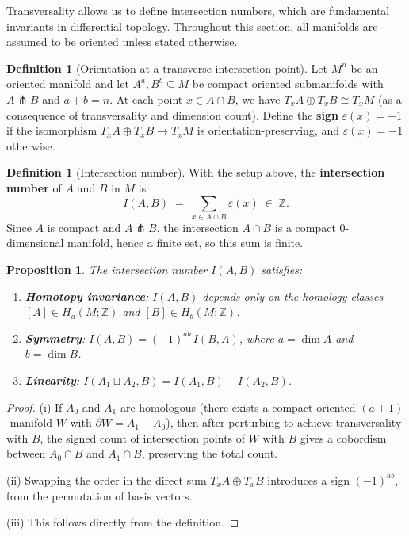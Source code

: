 \documentclass[12pt,a4paper,openany]{book}
\newtheorem{proposition}[theorem]{Proposition}
\theoremstyle{definition}
\newtheorem{definition}[theorem]{Definition}
\theoremstyle{remark}
\newcommand{\Z}{\mathbb{Z}}
\begin{document}
Transversality allows us to define intersection numbers, which are
fundamental invariants in differential topology. Throughout this section,
all manifolds are assumed to be oriented unless stated otherwise.

\begin{definition}[Orientation at a transverse intersection point]
\label{def:intersection-orientation}
Let $M^n$ be an oriented manifold and let $A^a, B^b \subseteq M$ be
compact oriented submanifolds with $A \pitchfork B$ and $a + b = n$.
At each point $x \in A \cap B$, we have
$T_x A \oplus T_x B \cong T_x M$ (as a consequence of transversality and
dimension count). Define the \textbf{sign} $\varepsilon(x) = +1$ if the
isomorphism $T_x A \oplus T_x B \to T_x M$ is orientation-preserving, and
$\varepsilon(x) = -1$ otherwise.
\end{definition}

\begin{definition}[Intersection number]\label{def:intersection-number}
With the setup above, the \textbf{intersection number} of $A$ and $B$
in $M$ is
\[
  I(A, B) \;=\; \sum_{x \in A \cap B} \varepsilon(x) \;\in\; \Z.
\]
Since $A$ is compact and $A \pitchfork B$, the intersection $A \cap B$ is a
compact $0$-dimensional manifold, hence a finite set, so this sum is finite.
\end{definition}

\begin{proposition}\label{prop:intersection-number-properties}
The intersection number $I(A, B)$ satisfies:
\begin{enumerate}[label=(\roman*)]
  \item \textbf{Homotopy invariance}: $I(A, B)$ depends only on the
    homology classes $[A] \in H_a(M; \Z)$ and $[B] \in H_b(M; \Z)$.
  \item \textbf{Symmetry}: $I(A, B) = (-1)^{ab}\, I(B, A)$, where
    $a = \dim A$ and $b = \dim B$.
  \item \textbf{Linearity}: $I(A_1 \sqcup A_2, B) = I(A_1, B) + I(A_2, B)$.
\end{enumerate}
\end{proposition}

\begin{proof}
(i) If $A_0$ and $A_1$ are homologous (there exists a compact oriented
$(a+1)$-manifold $W$ with $\partial W = A_1 - A_0$), then after perturbing
to achieve transversality with $B$, the signed count of intersection points
of $W$ with $B$ gives a cobordism between $A_0 \cap B$ and $A_1 \cap B$,
preserving the total count.

(ii) Swapping the order in the direct sum $T_x A \oplus T_x B$ introduces
a sign $(-1)^{ab}$, from the permutation of basis vectors.

(iii) This follows directly from the definition.
\end{proof}
\end{document}

